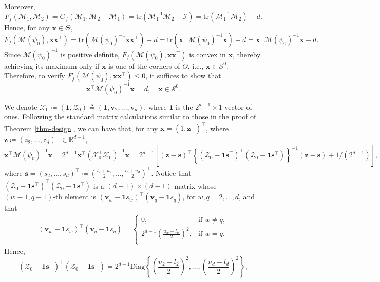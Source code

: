 \documentclass[ijoc,nonblindrev]{informs3}
\def\bx{{\bm x}}
\def\cX{{\mathcal X}}
\def\cI{{\mathcal I}}
\def\cZ{{\mathcal Z}}
\def\cS{{\mathcal{S}}}
\def\bv{{\bm v}}
\def\bz{{\bm z}}
\def\bs{{\bm s}}
\def\bone{{\bm 1}}
\def\cM{{\mathcal M}}
\def\tr{{\text{tr}}}
\begin{document}
Moreover,
$$F_f(\cM_1,\cM_2) = G_f(\cM_1,\cM_2-\cM_1) = \tr(\cM_1^{-1} \cM_2 - \cI) = \tr(\cM_1^{-1} \cM_2) - d.$$
Hence, for any $\bx \in \Theta$,
$$F_f(\cM(\psi_0),\bx \bx^\intercal) = \tr(\cM(\psi_0)^{-1} \bx \bx^\intercal) - d = \tr(\bx^\intercal \cM(\psi_0)^{-1} \bx) - d =  \bx^\intercal \cM(\psi_0)^{-1} \bx - d.$$
Since $\cM(\psi_0)^{-1}$ is positive definite, $F_f(\cM(\psi_0),\bx \bx^\intercal)$ is convex in $\bx$, thereby achieving its maximum only if $\bx$ is one of the corners of $\Theta$, i.e., $\bx \in \cS^0$.
Therefore, to verify $F_f(\cM(\psi_0),\bx \bx^\intercal)\leq 0$, it suffices to show  that
\begin{equation}\label{eq-D-goal}
\bx^\intercal \cM(\psi_0)^{-1} \bx = d,\quad \bx \in \cS^0.
\end{equation}

We denote $\cX_0 \coloneqq (\bone, \cZ_0) \triangleq (\bone, \bv_2, \ldots, \bv_d)$, where $\bone$ is the $2^{d-1} \times 1$ vector of ones.
Following the standard matrix calculations similar to those in the proof of Theorem \ref{thm-design}, we can have that, for any $\bx = (1, \bz^\intercal)^\intercal$, where $\bz \coloneqq \left(z_2,\ldots,z_d \right)^\intercal \in \mathbb{R}^{d-1}$,
\begin{equation}\label{eq-D-goal-a}
\bx^\intercal \cM(\psi_0)^{-1} \bx = 2^{d-1} \bx^\intercal (\cX_0^\intercal \cX_0)^{-1} \bx
 = 2^{d-1} \left[ \left( \bz - \bs \right)^\intercal \left\{ \left(\cZ_0 - \bone \bs^\intercal\right)^\intercal \left(\cZ_0 - \bone \bs^\intercal\right) \right\}^{-1} \left( \bz - \bs \right) + 1/\left(2^{d-1} \right) \right],
\end{equation}
where $\bs = \left(s_2,\ldots,s_d \right)^\intercal \coloneqq \left(\frac{l_2+u_2}{2},\ldots,\frac{l_d+u_d}{2} \right)^\intercal $.
Notice that $ \left(\cZ_0 - \bone \bs^\intercal\right)^\intercal \left(\cZ_0 - \bone \bs^\intercal\right) $ is a $(d-1) \times (d-1)$ matrix
whose $(w-1,q-1)$-th element is $(\bv_w-\bone s_w)^\intercal (\bv_q-\bone s_q)$, for $w,q=2,\ldots,d$, and that
\begin{align*}
(\bv_w-\bone s_w)^\intercal (\bv_q-\bone s_q) =
\begin{cases}
0, & \text{if $w\neq q$},\\[0.4em]
2^{d-1} \left(\frac{u_w-l_w}{2}\right)^2, & \text{if $w = q$}.\\
\end{cases}
\end{align*}
Hence,
$$ \left(\cZ_0 - \bone \bs^\intercal\right)^\intercal \left(\cZ_0 - \bone \bs^\intercal\right) = 2^{d-1} \mathrm{Diag}\left\{ \left(\frac{u_2-l_2}{2}\right)^2, \ldots, \left(\frac{u_d-l_d}{2}\right)^2 \right\},$$
\end{document}
